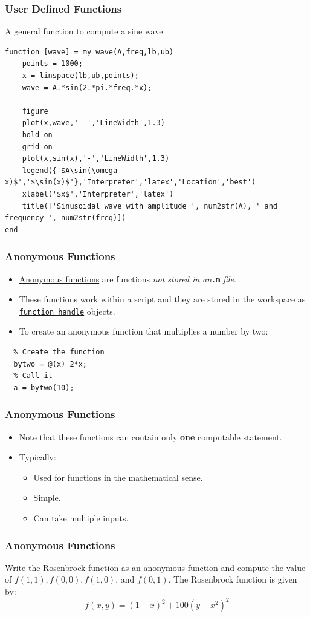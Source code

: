 \documentclass[11pt,xcolor={svgnames},aspectratio=169,usepdftitle=false,notheorems]{beamer}
\begin{document}
\begin{frame}[fragile]
    \frametitle{User Defined Functions}

A general function to compute a sine wave
\begin{lstlisting}
function [wave] = my_wave(A,freq,lb,ub)
    points = 1000;
    x = linspace(lb,ub,points);
    wave = A.*sin(2.*pi.*freq.*x);
    
    figure
    plot(x,wave,'--','LineWidth',1.3)
    hold on
    grid on
    plot(x,sin(x),'-','LineWidth',1.3)
    legend({'$A\sin(\omega x)$','$\sin(x)$'},'Interpreter','latex','Location','best')
    xlabel('$x$','Interpreter','latex')
    title(['Sinusoidal wave with amplitude ', num2str(A), ' and frequency ', num2str(freq)])
end
\end{lstlisting}
\end{frame}

\begin{frame}[fragile]
    \frametitle{Anonymous Functions}
    \begin{itemize}
      \item \href{https://www.mathworks.com/help/matlab/matlab_prog/anonymous-functions.html}{Anonymous functions} are functions \alert{\textit{not stored in an}\texttt{.m} \textit{file}}.
      \item These functions work within a script and they are stored in the workspace as \href{https://www.mathworks.com/help/matlab/ref/function_handle.html}{\texttt{function\_handle}} objects.
      \item To create an anonymous function that multiplies a number by two:
    \end{itemize}
  \begin{lstlisting}
  % Create the function
  bytwo = @(x) 2*x;
  % Call it
  a = bytwo(10);
  \end{lstlisting}
\end{frame}

\begin{frame}[fragile]
    \frametitle{Anonymous Functions}
    \begin{itemize}
        \item Note that these functions can contain only \alert{\textbf{one}} computable statement.
        \item Typically:
        \begin{itemize}
            \item Used for functions in the mathematical sense.
            \item Simple.
            \item Can take multiple inputs.
        \end{itemize}
    \end{itemize}
\end{frame}

\begin{frame}
    \frametitle{Anonymous Functions}
\begin{exercise}
Write the Rosenbrock function as an anonymous function and compute the value of $f(1,1), f(0,0), f(1,0)$, and $f(0,1)$. The Rosenbrock function is given by:
\[
f(x,y) = (1 - x)^2 + 100(y - x^2)^2    
\]
\end{exercise}
\end{frame}
\end{document}
